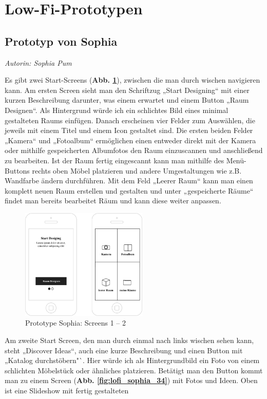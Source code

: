 \documentclass[12pt,paper=a4,oneside,hidelinks,headings=small,captions=heading,captions=nooneline]{scrartcl}
\begin{document}
\section{Low-Fi-Prototypen}
\label{sec:orge20236e}
\subsection{Prototyp von Sophia}
\label{sec:orgd451574}
\emph{Autorin: Sophia Pum}

Es gibt zwei Start-Screens (\textbf{Abb. \ref{fig:lofi_sophia_12}}), zwischen die man durch wischen navigieren
kann. Am ersten Screen sieht man den Schriftzug „Start Designing“ mit
einer kurzen Beschreibung darunter, was einem erwartet und einem
Button „Raum Designen“. Als Hintergrund würde ich ein schlichtes Bild
eines minimal gestalteten Raums einfügen. Danach erscheinen vier
Felder zum Auswählen, die jeweils mit einem Titel und einem Icon
gestaltet sind. Die ersten beiden Felder „Kamera“ und „Fotoalbum“
ermöglichen einen entweder direkt mit der Kamera oder mithilfe
gespeicherten Albumfotos den Raum einzuscannen und anschließend zu
bearbeiten. Ist der Raum fertig eingescannt kann man mithilfe des
Menü-Buttons rechts oben Möbel platzieren und andere Umgestaltungen
wie z.B. Wandfarbe ändern durchführen. Mit dem Feld „Leerer Raum“ kann
man einen komplett neuen Raum erstellen und gestalten und unter
„gespeicherte Räume“ findet man bereits bearbeitet Räum und kann diese
weiter anpassen.

\begin{figure}[htbp]
\centering
\includegraphics[height=200px]{./img/m2_lofi_sophia_12.png}
\caption{\label{fig:lofi_sophia_12}Prototype Sophia: Screens 1 -- 2}
\end{figure}

Am zweite Start Screen, den man durch einmal nach links wischen sehen
kann, steht „Discover Ideas“, auch eine kurze Beschreibung und einen
Button mit „Katalog durchstöbern"`. Hier würde ich als Hintergrundbild
ein Foto von einem schlichten Möbelstück oder ähnliches platzieren.
Betätigt man den Button kommt man zu einem Screen
(\textbf{Abb. \ref{fig:lofi_sophia_34}}) mit Fotos und Ideen.  Oben ist eine Slideshow
mit fertig gestalteten
\end{document}
